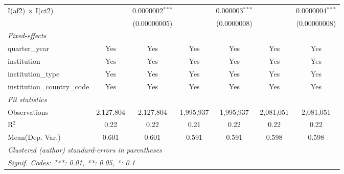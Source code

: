 \begin{tabular}{lcccccc}
   I(af\^2) $\times$ I(ct\^2)         &               & 0.0000002$^{***}$ &               & 0.000003$^{***}$ &               & 0.0000004$^{***}$\\   
                                      &               & (0.00000005)      &               & (0.0000008)      &               & (0.00000008)\\   
   \midrule
   \emph{Fixed-effects}\\
   quarter\_year                      & Yes           & Yes               & Yes           & Yes              & Yes           & Yes\\  
   institution                        & Yes           & Yes               & Yes           & Yes              & Yes           & Yes\\  
   institution\_type                  & Yes           & Yes               & Yes           & Yes              & Yes           & Yes\\  
   institution\_country\_code         & Yes           & Yes               & Yes           & Yes              & Yes           & Yes\\  
   \midrule
   \emph{Fit statistics}\\
   Observations                       & 2,127,804     & 2,127,804         & 1,995,937     & 1,995,937        & 2,081,051     & 2,081,051\\  
   R$^2$                              & 0.22          & 0.22              & 0.21          & 0.22             & 0.22          & 0.22\\  
Mean(Dep. Var.) & 0.601 & 0.601 & 0.591 & 0.591 & 0.598 & 0.598 \\
   \midrule \midrule
   \multicolumn{7}{l}{\emph{Clustered (author) standard-errors in parentheses}}\\
   \multicolumn{7}{l}{\emph{Signif. Codes: ***: 0.01, **: 0.05, *: 0.1}}\\
\end{tabular}
\par\endgroup
